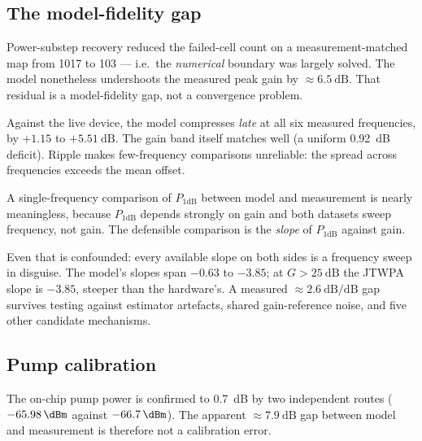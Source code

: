 \subsection{The model-fidelity gap}

\begin{measured}
Power-substep recovery reduced the failed-cell count on a measurement-matched
map from 1017 to 103 --- i.e.\ the \emph{numerical} boundary was largely solved.
The model nonetheless undershoots the measured peak gain by
$\approx\SI{6.5}{\dB}$. That residual is a model-fidelity gap, not a
convergence problem.
\end{measured}

\begin{measured}
Against the live device, the model compresses \emph{late} at all six measured
frequencies, by $+1.15$ to $+\SI{5.51}{\dB}$. The gain band itself matches well
(a uniform \SI{0.92}{\dB} deficit). Ripple makes few-frequency comparisons
unreliable: the spread across frequencies exceeds the mean offset.
\end{measured}

\begin{caveat}
A single-frequency comparison of $P_{1\mathrm{dB}}$ between model and
measurement is nearly meaningless, because $P_{1\mathrm{dB}}$ depends strongly on
gain and both datasets sweep frequency, not gain. The defensible comparison is
the \emph{slope} of $P_{1\mathrm{dB}}$ against gain.

Even that is confounded: every available slope on both sides is a frequency
sweep in disguise. The model's slopes span $-0.63$ to $-3.85$; at $G>\SI{25}{\dB}$
the JTWPA slope is $-3.85$, steeper than the hardware's. A measured
$\approx\SI{2.6}{\dB\per\dB}$ gap survives testing against estimator artefacts,
shared gain-reference noise, and five other candidate mechanisms.
\end{caveat}

\subsection{Pump calibration}

\begin{measured}
The on-chip pump power is confirmed to \SI{0.7}{\dB} by two independent routes
($\SI{-65.98}{\dBm}$ against $\SI{-66.7}{\dBm}$). The apparent
$\approx\SI{7.9}{\dB}$ gap between model and measurement is therefore not a
calibration error.
\end{measured}

